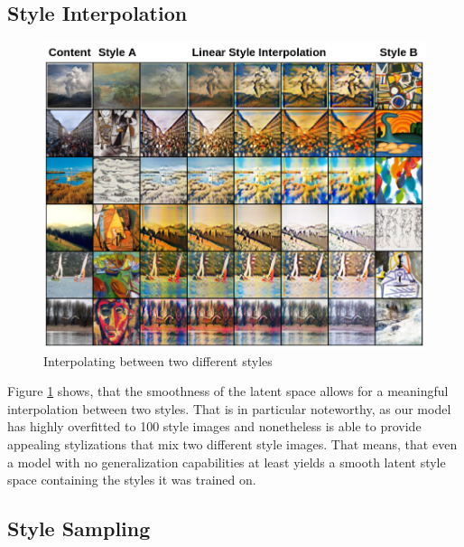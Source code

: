 \documentclass[10pt,twocolumn,letterpaper]{article}
\begin{document}
\subsection{Style Interpolation}

\begin{figure}
\centering
\includegraphics[width=0.9\linewidth]{interpolation.png}
\caption{Interpolating between two different styles}
\label{fig:interpolation}
\end{figure}

Figure \ref{fig:interpolation} shows, that the smoothness of the latent space allows for a meaningful interpolation between two styles. That is in particular noteworthy, as our model has highly overfitted to 100 style images and nonetheless is able to provide appealing stylizations that mix two different style images. That means, that even a model with no generalization capabilities at least yields a smooth latent style space containing the styles it was trained on.

\subsection{Style Sampling}
\end{document}
